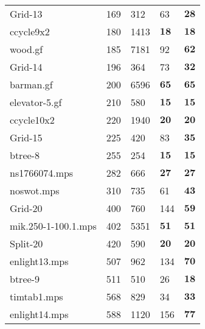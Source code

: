 \documentclass{article}
\begin{document}
\begin{longtable}{|l |l |l |l |l |}
Grid-13&169&312&63&$\mathbf{28}$\\
ccycle9x2&180&1413&$\mathbf{18}$&$\mathbf{18}$\\
wood.gf&185&7181&92&$\mathbf{62}$\\
Grid-14&196&364&73&$\mathbf{32}$\\
barman.gf&200&6596&$\mathbf{65}$&$\mathbf{65}$\\
elevator-5.gf&210&580&$\mathbf{15}$&$\mathbf{15}$\\
ccycle10x2&220&1940&$\mathbf{20}$&$\mathbf{20}$\\
Grid-15&225&420&83&$\mathbf{35}$\\
btree-8&255&254&$\mathbf{15}$&$\mathbf{15}$\\
ns1766074.mps&282&666&$\mathbf{27}$&$\mathbf{27}$\\
noswot.mps&310&735&61&$\mathbf{43}$\\
Grid-20&400&760&144&$\mathbf{59}$\\
mik.250-1-100.1.mps&402&5351&$\mathbf{51}$&$\mathbf{51}$\\
Split-20&420&590&$\mathbf{20}$&$\mathbf{20}$\\
enlight13.mps&507&962&134&$\mathbf{70}$\\
btree-9&511&510&26&$\mathbf{18}$\\
timtab1.mps&568&829&34&$\mathbf{33}$\\
enlight14.mps&588&1120&156&$\mathbf{77}$\\
\hline
\end{longtable}
\end{document}

